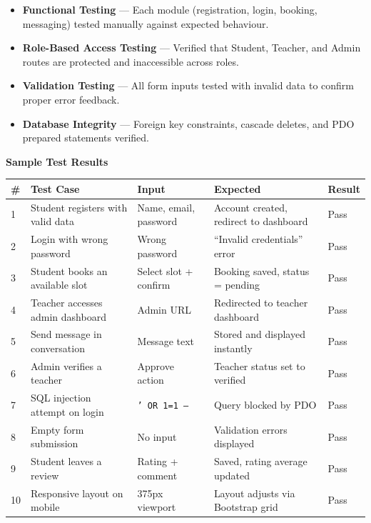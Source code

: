 \documentclass[12pt,a4paper]{report}
\begin{document}
\begin{itemize}[leftmargin=1.5em, itemsep=2pt]
    \item \textbf{Functional Testing} — Each module (registration, login, booking, messaging) tested manually against expected behaviour.
    \item \textbf{Role-Based Access Testing} — Verified that Student, Teacher, and Admin routes are protected and inaccessible across roles.
    \item \textbf{Validation Testing} — All form inputs tested with invalid data to confirm proper error feedback.
    \item \textbf{Database Integrity} — Foreign key constraints, cascade deletes, and PDO prepared statements verified.
\end{itemize}

\vspace{0.5cm}
\textbf{Sample Test Results}

\vspace{0.2cm}
\begin{tabular}{@{}C{0.5cm} L{4.8cm} L{4cm} L{2.5cm} C{1.5cm}@{}}
\toprule
{}\color{white}\textbf{\#} & \color{white}\textbf{Test Case} & \color{white}\textbf{Input} & \color{white}\textbf{Expected} & \color{white}\textbf{Result} \\
 & Student registers with valid data & Name, email, password & Account created, redirect to dashboard & \textcolor{green!60!black}{Pass} \\
2 & Login with wrong password & Wrong password & ``Invalid credentials'' error & \textcolor{green!60!black}{Pass} \\
3 & Student books an available slot & Select slot + confirm & Booking saved, status = pending & \textcolor{green!60!black}{Pass} \\
4 & Teacher accesses admin dashboard & Admin URL & Redirected to teacher dashboard & \textcolor{green!60!black}{Pass} \\
5 & Send message in conversation & Message text & Stored and displayed instantly & \textcolor{green!60!black}{Pass} \\
6 & Admin verifies a teacher & Approve action & Teacher status set to verified & \textcolor{green!60!black}{Pass} \\
7 & SQL injection attempt on login & \texttt{' OR 1=1 --} & Query blocked by PDO & \textcolor{green!60!black}{Pass} \\
8 & Empty form submission & No input & Validation errors displayed & \textcolor{green!60!black}{Pass} \\
9 & Student leaves a review & Rating + comment & Saved, rating average updated & \textcolor{green!60!black}{Pass} \\
10 & Responsive layout on mobile & 375px viewport & Layout adjusts via Bootstrap grid & \textcolor{green!60!black}{Pass} \\
\bottomrule
\end{tabular}
\end{document}
